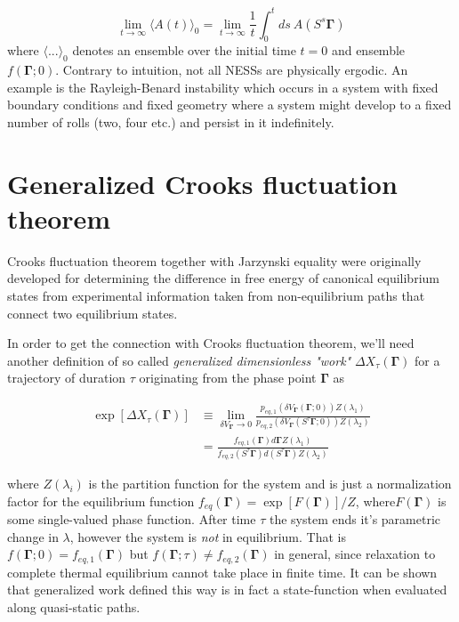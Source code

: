 \documentclass[a4paper,12pt,nofootinbib]{article}
\begin{document}
\begin{equation}
      \lim_{t \to \infty} \langle A(t) \rangle_0 = \lim_{t \to \infty} \frac{1}{t} \int_0^t ds\ A(S^s \bm{\Gamma})
\end{equation}
 where $\langle ... \rangle_0$ denotes an ensemble over the initial time $t=0$ and ensemble $f(\bm{\Gamma};0)$.
Contrary to intuition, not all NESSs are physically ergodic. An example is the Rayleigh-Benard instability which occurs in a system with fixed boundary conditions and fixed geometry where a system might develop to a fixed number of rolls (two, four etc.) and persist in it indefinitely.
\section{Generalized Crooks fluctuation theorem}

Crooks fluctuation theorem together with Jarzynski equality were originally developed for determining the difference in free energy of canonical equilibrium states from experimental information taken from non-equilibrium paths that connect two equilibrium states. 

In order to get the connection with Crooks fluctuation theorem, we'll need another definition of so called \textit{generalized dimensionless "work"} $\Delta X_{\tau}(\bm{\Gamma})$ for a trajectory of duration $\tau$ originating from the phase point $\bm{\Gamma}$ as

\begin{equation}
\begin{aligned}
\label{GeneralizedWorkDef}
  \exp[\Delta X_{\tau}(\bm{\Gamma})] &\equiv \lim_{\delta V_{\bm{\Gamma}} \to 0} \frac{p_{eq,1} (\delta V_{\bm{\Gamma}}(\bm{\Gamma};0))Z(\lambda_1)}{p_{eq,2} (\delta V_{\bm{\Gamma}}(S^{\tau}\bm{\Gamma};0))Z(\lambda_2)} \\
  &= \frac{f_{eq,1}(\bm{\Gamma}) d\bm{\Gamma} Z(\lambda_1)}{f_{eq,2}(S^{\tau}\bm{\Gamma}) d(S^{\tau}\bm{\Gamma}) Z(\lambda_2)}
\end{aligned}
\end{equation}

where $Z(\lambda_i)$ is the partition function for the system and is just a normalization factor for the equilibrium function $f_{eq}(\bm{\Gamma}) =\exp[F(\bm{\Gamma})]/Z$, where$F(\bm{\Gamma})$ is some single-valued phase function. After time $\tau$ the system ends it's parametric change in $\lambda$, however the system is \textit{not} in equilibrium. That is $f(\bm{\Gamma};0)=f_{eq,1}(\bm{\Gamma})$ but $f(\bm{\Gamma};\tau)\neq f_{eq,2}(\bm{\Gamma})$ in general, since relaxation to complete thermal equilibrium cannot take place in finite time.
It can be shown that generalized work defined this way is in fact a state-function when evaluated along quasi-static paths.
\end{document}
